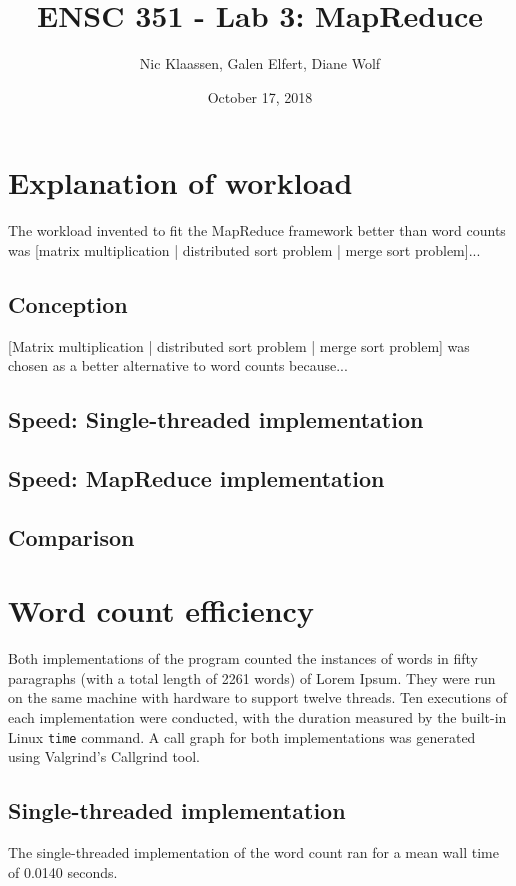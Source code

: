 \documentclass[12pt, letterpaper]{article}
\begin{document}
\title{ENSC 351 - Lab 3: MapReduce}
\date{October 17, 2018}
\author{Nic Klaassen, Galen Elfert, Diane Wolf}
\maketitle
\section{Explanation of workload}
	The workload invented to fit the MapReduce framework better than word counts was {[matrix multiplication | distributed sort problem | merge sort problem]...}
\subsection{Conception}
	{[Matrix multiplication | distributed sort problem | merge sort problem]} was chosen as a better alternative to word counts because...
\subsection{Speed: Single-threaded implementation}
	
\subsection{Speed: MapReduce implementation}
\subsection{Comparison}
\section{Word count efficiency}
	Both implementations of the program counted the instances of words in fifty paragraphs (with a total length of 2261 words) of Lorem Ipsum. They were run on the same machine with hardware to support twelve threads. Ten executions of each implementation were conducted, with the duration measured by the built-in Linux \texttt{time} command. A call graph for both implementations was generated using Valgrind's Callgrind tool.
\subsection{Single-threaded implementation}
	The single-threaded implementation of the word count ran for a mean wall time of 0.0140 seconds.
\end{document}
